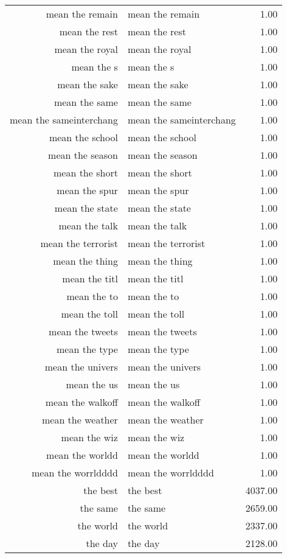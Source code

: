 \begin{table}[ht]
\begin{tabular}{rlr}
  mean the remain & mean the remain & 1.00 \\ 
  mean the rest & mean the rest & 1.00 \\ 
  mean the royal & mean the royal & 1.00 \\ 
  mean the s & mean the s & 1.00 \\ 
  mean the sake & mean the sake & 1.00 \\ 
  mean the same & mean the same & 1.00 \\ 
  mean the sameinterchang & mean the sameinterchang & 1.00 \\ 
  mean the school & mean the school & 1.00 \\ 
  mean the season & mean the season & 1.00 \\ 
  mean the short & mean the short & 1.00 \\ 
  mean the spur & mean the spur & 1.00 \\ 
  mean the state & mean the state & 1.00 \\ 
  mean the talk & mean the talk & 1.00 \\ 
  mean the terrorist & mean the terrorist & 1.00 \\ 
  mean the thing & mean the thing & 1.00 \\ 
  mean the titl & mean the titl & 1.00 \\ 
  mean the to & mean the to & 1.00 \\ 
  mean the toll & mean the toll & 1.00 \\ 
  mean the tweets & mean the tweets & 1.00 \\ 
  mean the type & mean the type & 1.00 \\ 
  mean the univers & mean the univers & 1.00 \\ 
  mean the us & mean the us & 1.00 \\ 
  mean the walkoff & mean the walkoff & 1.00 \\ 
  mean the weather & mean the weather & 1.00 \\ 
  mean the wiz & mean the wiz & 1.00 \\ 
  mean the worldd & mean the worldd & 1.00 \\ 
  mean the worrldddd & mean the worrldddd & 1.00 \\ 
  the best & the best & 4037.00 \\ 
  the same & the same & 2659.00 \\ 
  the world & the world & 2337.00 \\ 
  the day & the day & 2128.00 \\ 

\end{tabular}
\end{table}
